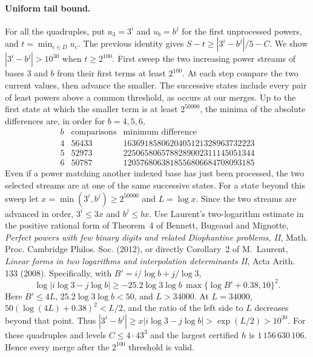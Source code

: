 \documentclass[11pt]{article}
\begin{document}
\paragraph{Uniform tail bound.}
For all the quadruples, put $u_3=3^i$ and $u_b=b^j$ for the first
unprocessed powers, and $t=\min_{e\in D}u_e$. The previous identity
gives $S-t\ge |3^i-b^j|/5-C$. We show
$|3^i-b^j|>10^{30}$ when $t\ge2^{100}$.
First sweep the two increasing power streams of bases 3 and $b$
from their first terms at least $2^{100}$. At each step compare the
two current values, then advance the smaller. The successive states
include every pair of least powers above a common threshold, as
occurs at our merges. Up to the first state at which the smaller
term is at least $2^{50000}$, the minima of the absolute differences
are, in order for $b=4,5,6$,
\[
\begin{array}{r|r|r}
 b &\text{comparisons}&\text{minimum difference}\\ \hline
 4&56433&1636918580620405121328963732223\\
 5&52973&2250658065788289002311145051344\\
 6&50787&1205768063818556806684708093185
\end{array}
\]
Even if a power matching another indexed base has just been processed,
the two selected streams are at one of the same successive states.
For a state beyond this sweep let $x=\min(3^i,b^j)\ge2^{50000}$
and $L=\log x$. Since the two streams are advanced in order,
$3^i\le3x$ and $b^j\le bx$. Use Laurent's two-logarithm estimate
in the positive rational form of Theorem~4 of Bennett, Bugeaud and
Mignotte, \emph{Perfect powers with few binary digits and related
Diophantine problems, II}, Math. Proc. Cambridge Philos. Soc. (2012),
or directly Corollary~2 of M.~Laurent, \emph{Linear forms in two
logarithms and interpolation determinants II}, Acta Arith. 133 (2008).
Specifically, with $B'=i/\log b+j/\log3$,
\[
 \log |i\log3-j\log b|
 \ge -25.2\log3\log b\,
       \max\{\log B'+0.38,10\}^2 .
\]
Here $B'\le4L$, $25.2\log3\log b<50$, and $L>34000$.
At $L=34000$, $50(\log(4L)+0.38)^2<L/2$, and the ratio of
the left side to $L$ decreases beyond that point. Thus
$|3^i-b^j|\ge x|i\log3-j\log b|>\exp(L/2)>10^{30}$.
For these quadruples and levels $C\le4\cdot43^3$ and the largest
certified $h$ is $1\,156\,630\,106$. Hence every merge after the
$2^{100}$ threshold is valid.
\end{document}
